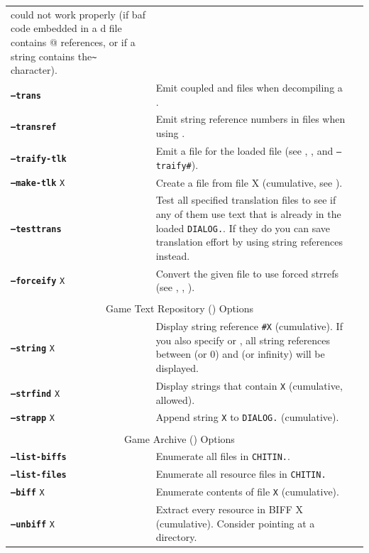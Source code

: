 \documentclass{article}
\def\ttref#1{\ahrefloc{#1}{\tt #1}}
\def\DEFINE#1{{\tt \bf #1}\label{#1}\index{#1}}
\def\t#1{{\tt #1}}
\begin{document}
\begin{tabular}{lp{10in}|p{10in}}
  could not work properly (if baf code embedded in a d file contains @ references, or if a string contains
  the\verb+~+ character). \\
\DEFINE{--trans} & Emit coupled \ttref{D} and \ttref{TRA} files when
  decompiling a \ttref{DLG}.  \\
\DEFINE{--transref} &	Emit string reference numbers in \ttref{TRA} files
when using \ttref{--trans}. \\
\DEFINE{--traify-tlk} & Emit a \ttref{TRA} file for the loaded \ttref{TLK} file (see \ttref{--tlkin}, \ttref{--out}, \ttref{--min} and \t{--traify\#}). \\
\DEFINE{--make-tlk} \t{X} & Create a \ttref{TLK} file from \ttref{TRA} file X (cumulative, see \ttref{--tlkout}). \\
\DEFINE{--testtrans} &	Test all specified \ttref{TRA} translation files to
see if any of them use text that is already in the loaded
\t{DIALOG.}\ttref{TLK}. If they do you can save translation effort by using
string references instead. \\
\DEFINE{--forceify} \t{X} & Convert the given \ttref{D} file to use forced
strrefs (see \ttref{--out}, \ttref{SAY}, \ttref{Forced String Reference}). \\
\\
\multicolumn{2}{c}{ \color{red} Game Text Repository (\ttref{TLK}) Options} \\
\DEFINE{--string} \t{X}&	Display string reference {\tt \#X} (cumulative). If you also specify \ttref{--min} or \ttref{--max}, all string references between \ttref{--min} (or 0) and \ttref{--max} (or infinity) will be displayed. \\
\DEFINE{--strfind} \t{X}&	Display strings that contain {\tt X} (cumulative, \ttref{regexp} allowed). \\
\DEFINE{--strapp} \t{X}&	Append string \t{X} to \t{DIALOG.}\ttref{TLK} (cumulative). \\
\\
\multicolumn{2}{c}{ \color{red} Game Archive (\ttref{BIFF}) Options} \\
\DEFINE{--list-biffs}&	Enumerate all \ttref{BIFF} files in \t{CHITIN.}\ttref{KEY}. \\
\DEFINE{--list-files}&	Enumerate all resource files in \t{CHITIN.}\ttref{KEY} \\
\DEFINE{--biff} \t{X} & Enumerate contents of \ttref{BIFF} file \t{X} (cumulative). \\
\DEFINE{--unbiff} \t{X} & Extract every resource in BIFF X
(cumulative). Consider pointing \ttref{--out} at a directory. \\

\end{tabular}
\end{document}
